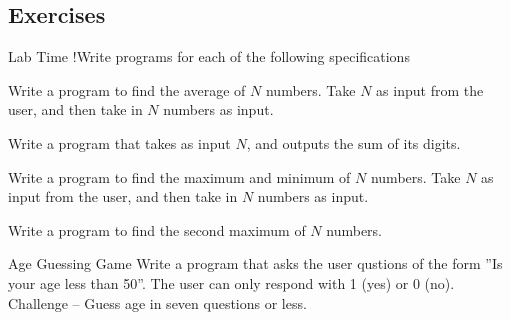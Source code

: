 \subsection{Exercises}

\begin{frame}[fragile]{Lab Time !}{Write programs for each of the following specifications}
    \begin{block}{}
        Write a program to find the average of $N$ numbers.
        Take $N$ as input from the user, and then take in $N$ numbers as input.
    \end{block}
    \begin{block}{}
        Write a program that takes as input $N$,
        and outputs the sum of its digits.
    \end{block}
    \begin{block}{}
        Write a program to find the maximum and minimum of $N$ numbers.
        Take $N$ as input from the user, and then take in $N$ numbers as input.
    \end{block}
    \begin{block}{}
        Write a program to find the second maximum of $N$ numbers.
    \end{block}
    \begin{block}{Age Guessing Game}
        Write a program that asks the user qustions of the form
        ''Is your age less than 50''.
        The user can only respond with 1 (yes) or 0 (no).\\
        Challenge -- Guess age in seven questions or less.
    \end{block}
\end{frame}
